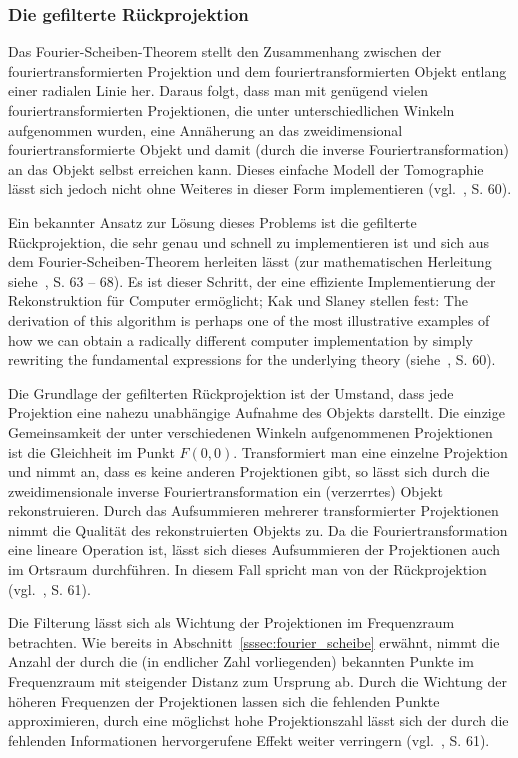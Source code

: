 \subsubsection{Die gefilterte Rückprojektion}\label{sssec:filter_bp}

Das Fourier-Scheiben-Theorem stellt den Zusammenhang zwischen der fouriertransformierten Projektion und dem
fouriertransformierten Objekt entlang einer radialen Linie her. Daraus folgt, dass man mit genügend vielen
fouriertransformierten Projektionen, die unter unterschiedlichen Winkeln aufgenommen wurden, eine Annäherung an das
zweidimensional fouriertransformierte Objekt und damit (durch die inverse Fouriertransformation) an das Objekt selbst
erreichen kann. Dieses einfache Modell der Tomographie lässt sich jedoch nicht ohne Weiteres in dieser Form
implementieren (vgl.~\cite{kakslan}, S. 60).

Ein bekannter Ansatz zur Lösung dieses Problems ist die gefilterte Rückprojektion, die sehr genau und schnell zu
implementieren ist und sich aus dem Fourier-Scheiben-Theorem herleiten lässt (zur mathematischen Herleitung
siehe~\cite{kakslan}, S. 63 -- 68). Es ist dieser Schritt, der eine effiziente Implementierung der Rekonstruktion für
Computer ermöglicht; Kak und Slaney stellen fest: {\glqq}The derivation of this algorithm is perhaps one of the most
illustrative examples of how we can obtain a radically different computer implementation by simply rewriting the
fundamental expressions for the underlying theory{\grqq} (siehe~\cite{kakslan}, S. 60).

Die Grundlage der gefilterten Rückprojektion ist der Umstand, dass jede Projektion eine nahezu unabhängige Aufnahme
des Objekts darstellt. Die einzige Gemeinsamkeit der unter verschiedenen Winkeln aufgenommenen Projektionen ist die
Gleichheit im Punkt $F(0, 0)$. Transformiert man eine einzelne Projektion und nimmt an, dass es keine anderen
Projektionen gibt, so lässt sich durch die zweidimensionale inverse Fouriertransformation ein (verzerrtes) Objekt
rekonstruieren. Durch das Aufsummieren mehrerer transformierter Projektionen nimmt die Qualität des rekonstruierten
Objekts zu. Da die Fouriertransformation eine lineare Operation ist, lässt sich dieses Aufsummieren der Projektionen
auch im Ortsraum durchführen. In diesem Fall spricht man von der Rückprojektion (vgl.~\cite{kakslan}, S. 61).

Die Filterung lässt sich als Wichtung der Projektionen im Frequenzraum betrachten. Wie bereits in
Abschnitt~\ref{sssec:fourier_scheibe} erwähnt, nimmt die Anzahl der durch die (in endlicher Zahl vorliegenden) bekannten
Punkte im Frequenzraum mit steigender Distanz zum Ursprung ab. Durch die Wichtung der höheren Frequenzen der
Projektionen lassen sich die fehlenden Punkte approximieren, durch eine möglichst hohe Projektionszahl lässt sich der 
durch die fehlenden Informationen hervorgerufene Effekt weiter verringern (vgl.~\cite{kakslan}, S. 61).

